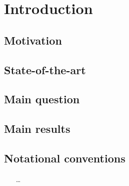 \chapter{Introduction}

\section{Motivation}

\section{State-of-the-art} %

\section{Main question}

\section{Main results}

\section{Notational conventions}

{\color{blue}
\begin{itemize}
	\item [\dots]  %
\end{itemize}
}